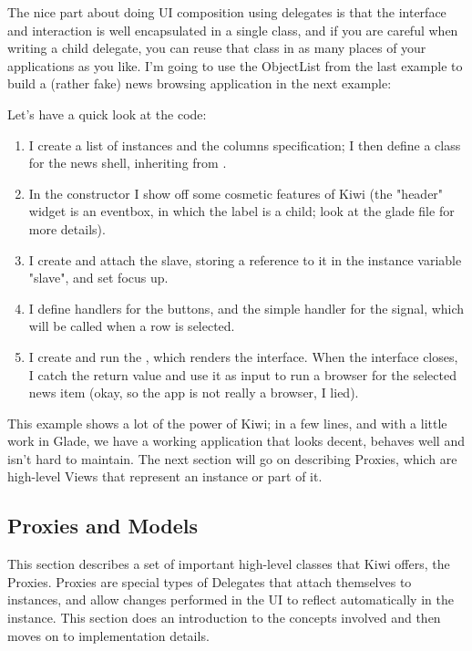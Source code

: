 \documentclass[a4paper]{howto}
\begin{document}
The nice part about doing UI composition using delegates is that the
interface and interaction is well encapsulated in a single class, and if
you are careful when writing a child delegate, you can reuse that class
in as many places of your applications as you like.  I'm going to use
the ObjectList from the last example to build a (rather fake) news
browsing application in the next example:




Let's have a quick look at the code:

\begin{enumerate}
\item I create a list of instances and the columns specification; I then
define a class for the news shell, inheriting from
.
\item In the constructor I show off some cosmetic features of Kiwi (the
"header" widget is an eventbox, in which the label is a child; look at
the glade file for more details).
\item I create and attach the slave, storing a reference to it in the
instance variable "slave", and set focus up.
\item I define handlers for the buttons, and the simple handler
 for the  signal, which will be
called when a row is selected.
\item I create and run the , which renders the interface.
When the interface closes, I catch the return value  and
use it as input to run a browser for the selected news item (okay, so
the app is not really a browser, I lied).
\end{enumerate}

This example shows a lot of the power of Kiwi; in a few lines, and with
a little work in Glade, we have a working application that looks decent,
behaves well and isn't hard to maintain. The next section will go on
describing Proxies, which are high-level Views that represent an
instance or part of it.

\subsection{Proxies and Models}

This section describes a set of important high-level classes that Kiwi
offers, the Proxies. Proxies are special types of Delegates that attach
themselves to instances, and allow changes performed in the UI to
reflect automatically in the instance. This section does an introduction
to the concepts involved and then moves on to implementation details.
\end{document}
